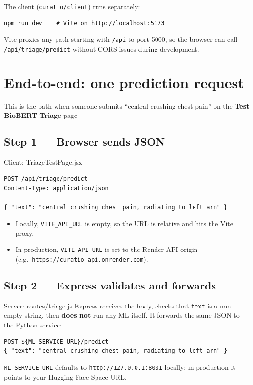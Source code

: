\documentclass[11pt]{article}
\newcommand{\route}[1]{{\small\texttt{\textcolor{mutel}{#1}}}}
\begin{document}
The client (\route{curatio/client}) runs separately:

\begin{lstlisting}
npm run dev    # Vite on http://localhost:5173
\end{lstlisting}

Vite proxies any path starting with \texttt{/api} to port 5000, so the browser can call
\texttt{/api/triage/predict} without CORS issues during development.

\section{End-to-end: one prediction request}

This is the path when someone submits ``central crushing chest pain'' on the \textbf{Test BioBERT
Triage} page.

\subsection{Step 1 --- Browser sends JSON}

\begin{filebox}{Client: TriageTestPage.jsx}
\begin{lstlisting}
POST /api/triage/predict
Content-Type: application/json

{ "text": "central crushing chest pain, radiating to left arm" }
\end{lstlisting}
\end{filebox}

\begin{itemize}
  \item Locally, \texttt{VITE\_API\_URL} is empty, so the URL is relative and hits the Vite proxy.
  \item In production, \texttt{VITE\_API\_URL} is set to the Render API origin (e.g.\
        \texttt{https://curatio-api.onrender.com}).
\end{itemize}

\subsection{Step 2 --- Express validates and forwards}

\begin{filebox}{Server: routes/triage.js}
Express receives the body, checks that \texttt{text} is a non-empty string, then \textbf{does not}
run any ML itself. It forwards the same JSON to the Python service:

\begin{lstlisting}
POST ${ML_SERVICE_URL}/predict
{ "text": "central crushing chest pain, radiating to left arm" }
\end{lstlisting}

\texttt{ML\_SERVICE\_URL} defaults to \texttt{http://127.0.0.1:8001} locally; in production it
points to your Hugging Face Space URL.
\end{filebox}
\end{document}
